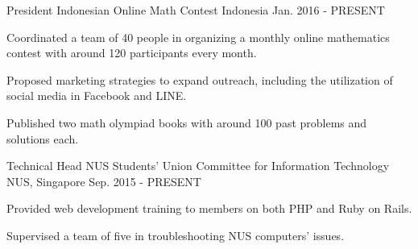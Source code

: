 

\begin{cventries}


	\cventry
	{President} %
	{Indonesian Online Math Contest} %
	{Indonesia} %
	{Jan. 2016 - PRESENT} %
	{ %
		\begin{cvitems}
		\item {Coordinated a team of 40 people in organizing a monthly online mathematics contest with around 120 participants every month.}
		\item {Proposed marketing strategies to expand outreach, including the utilization of social media in Facebook and LINE.}
		\item {Published two math olympiad books with around 100 past problems and solutions each.}
		\end{cvitems}
	}


	\cventry
	{Technical Head} %
	{NUS Students' Union Committee for Information Technology} %
	{NUS, Singapore} %
	{Sep. 2015 - PRESENT} %
	{ %
		\begin{cvitems}
		\item {Provided web development training to members on both PHP and Ruby on Rails.}
		\item {Supervised a team of five in troubleshooting NUS computers' issues.}
		\end{cvitems}
	}


\end{cventries}

